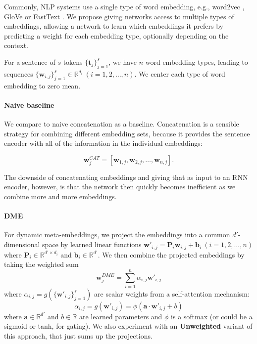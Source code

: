 \documentclass[11pt,a4paper]{article}
\begin{document}
Commonly, NLP systems use a single type of word embedding, e.g., word2vec \cite{Mikolov:2013nips}, GloVe \cite{Pennington:2014emnlp} or FastText \cite{Bojanowski:2016arxiv}. We propose giving networks access to multiple types of embeddings, allowing a network to learn which embeddings it prefers by predicting a weight for each embedding type, optionally depending on the context.

For a sentence of $s$ tokens $\{\mathbf{t}_{j}\}_{j=1}^{s}$, we have $n$ word embedding types, leading to sequences $\{\mathbf{w}_{i, j}\}_{j=1}^{s}\in\mathbb{R}^{d_i}\:(i=1,2,\ldots,n)$. We center each type of word embedding to zero mean.

\paragraph{Naive baseline}

We compare to naive concatenation as a baseline. Concatenation is a sensible strategy for combining different embedding sets, because it provides the sentence encoder with all of the information in the individual embeddings:

\begin{equation*}
\mathbf{w}^{CAT}_{j} = [\mathbf{w}_{1,j}, \mathbf{w}_{2,j}, \ldots, \mathbf{w}_{n,j}].
\end{equation*}

\noindent The downside of concatenating embeddings and giving that as input to an RNN encoder, however, is that the network then quickly becomes inefficient as we combine more and more embeddings.

\paragraph{DME}

For dynamic meta-embeddings, we project the embeddings into a common $d'$-dimensional space by learned linear functions $\mathbf{w'}_{i,j}=\mathbf{P}_i\mathbf{w}_{i,j}+\mathbf{b}_i\:(i=1,2,\ldots,n)$ where $\mathbf{P}_i\in\mathbb{R}^{d'\times d_i}$ and $\mathbf{b}_i\in\mathbb{R}^{d'}$. We then combine the projected embeddings by taking the weighted sum 
\[
\mathbf{w}^{DME}_{j}=\sum_{i=1}^{n}\alpha_{i,j}\mathbf{w'}_{i,j}
\]
where $\alpha_{i,j}=g(\{\mathbf{w'}_{i,j}\}_{j=1}^{s})$ are scalar weights from a self-attention mechanism:
\begin{equation}
\label{eq:dme}
\alpha_{i,j}=g(\mathbf{w'}_{i,j})=\phi(\mathbf{a}\cdot\mathbf{w'}_{i,j} + b)
\end{equation}
where $\mathbf{a}\in\mathbb{R}^{d'}$ and $b\in\mathbb{R}$ are learned parameters and $\phi$ is a softmax (or could be a sigmoid or tanh, for gating). We also experiment with an \textbf{Unweighted} variant of this approach, that just sums up the projections.
\end{document}

